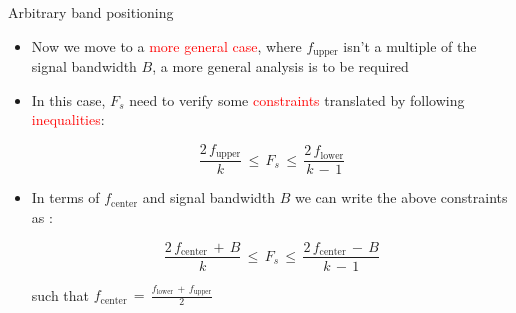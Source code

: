 \begin{frame}[t]{Arbitrary band positioning}

\begin{itemize}
\item Now we move to a \textcolor{red}{more general case}, where  $f_{\text{upper}}$ isn't a multiple of the signal bandwidth $B$, a more general analysis is to be required


\item In this case, $F_s$ need to verify some  \textcolor{red}{constraints} translated by following \textcolor{red}{inequalities}:

\begin{equation}
\displaystyle\frac{2 \, f_{\text{upper}}}{k} \, \leq \, F_s \, \leq \, \displaystyle\frac{2 \, f_{\text{lower}}}{k \, - \, 1}
\end{equation}

\item In terms of $f_{\text{center}}$ and signal bandwidth $B$ we can write the above constraints as \cite{book_understanding_dsp}:

\begin{equation}
\displaystyle\frac{2 \, f_{\text{center}} \, + \, B}{k} \, \leq \, F_s \, \leq \, \displaystyle\frac{2 \, f_{\text{center}} \, - \, B}{k \, - \, 1}
\end{equation}

such that $f_{\text{center}} \, = \, \displaystyle\frac{f_{\text{lower}} \, + \, f_{\text{upper}}}{2}$


\end{itemize}

\end{frame}


